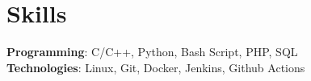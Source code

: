 \documentclass[A4,11pt]{article}
\begin{document}
\section{Skills}
 \begin{itemize}[leftmargin=0.5cm, label={}]
    \small{\item{
      \textbf{Programming}{: C/C++, Python, Bash Script, PHP, SQL} \\
      \textbf{Technologies}{: Linux, Git, Docker, Jenkins, Github Actions} \\
    }}
 \end{itemize}
    
\end{document}
